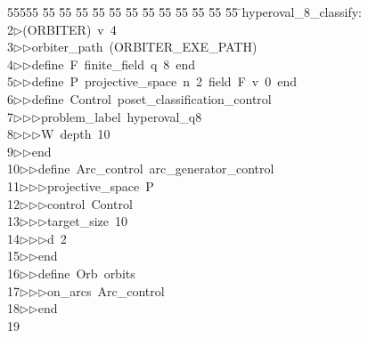 %
%
\begin{tabbing}
55555 \= 55 \= 55 \= 55 \= 55 \= 55 \= 55 \= 55 \= 55 \= 55 \= 55 \= 55 \= 55 \= \>hyperoval\_8\_classify:\\[0pt]
2\>$\triangleright$\>(ORBITER)\ v\ 4\ \\[0pt]
3\>$\triangleright$\>$\triangleright$\>orbiter\_path\ (ORBITER\_EXE\_PATH)\ \\[0pt]
4\>$\triangleright$\>$\triangleright$\>define\ F\ finite\_field\ q\ 8\ end\ \\[0pt]
5\>$\triangleright$\>$\triangleright$\>define\ P\ projective\_space\ n\ 2\ field\ F\ v\ 0\ end\ \\[0pt]
6\>$\triangleright$\>$\triangleright$\>define\ Control\ poset\_classification\_control\ \\[0pt]
7\>$\triangleright$\>$\triangleright$\>$\triangleright$\>problem\_label\ hyperoval\_q8\ \\[0pt]
8\>$\triangleright$\>$\triangleright$\>$\triangleright$\>W\ depth\ 10\ \\[0pt]
9\>$\triangleright$\>$\triangleright$\>end\ \\[0pt]
10\>$\triangleright$\>$\triangleright$\>define\ Arc\_control\ arc\_generator\_control\ \\[0pt]
11\>$\triangleright$\>$\triangleright$\>$\triangleright$\>projective\_space\ P\ \\[0pt]
12\>$\triangleright$\>$\triangleright$\>$\triangleright$\>control\ Control\ \\[0pt]
13\>$\triangleright$\>$\triangleright$\>$\triangleright$\>target\_size\ 10\ \\[0pt]
14\>$\triangleright$\>$\triangleright$\>$\triangleright$\>d\ 2\ \\[0pt]
15\>$\triangleright$\>$\triangleright$\>end\ \\[0pt]
16\>$\triangleright$\>$\triangleright$\>define\ Orb\ orbits\ \\[0pt]
17\>$\triangleright$\>$\triangleright$\>$\triangleright$\>on\_arcs\ Arc\_control\ \\[0pt]
18\>$\triangleright$\>$\triangleright$\>end\\[0pt]
19\>\end{tabbing}
